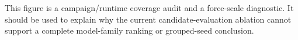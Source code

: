 This figure is a campaign/runtime coverage audit and a force-scale diagnostic. It should be used to explain why the current candidate-evaluation ablation cannot support a complete model-family ranking or grouped-seed conclusion.
